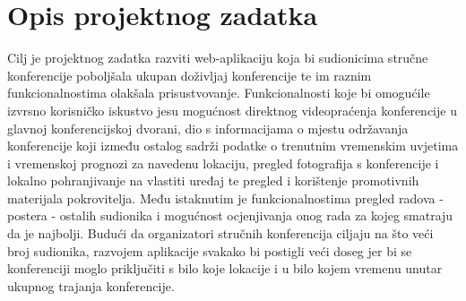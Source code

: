 \chapter{Opis projektnog zadatka}
		
		
		

		Cilj je projektnog zadatka razviti web-aplikaciju koja bi sudionicima stručne konferencije poboljšala ukupan doživljaj konferencije te im raznim funkcionalnostima olakšala prisustvovanje. Funkcionalnosti koje bi omogućile izvrsno korisničko iskustvo jesu mogućnost direktnog videopraćenja konferencije u glavnoj konferencijskoj dvorani, dio s informacijama o mjestu održavanja konferencije koji između ostalog sadrži podatke o trenutnim vremenskim uvjetima i vremenskoj prognozi za navedenu lokaciju, pregled fotografija s konferencije i lokalno pohranjivanje na vlastiti uređaj te pregled i korištenje promotivnih materijala pokrovitelja. Među istaknutim je funkcionalnostima pregled radova - postera - ostalih sudionika i mogućnost ocjenjivanja onog rada za kojeg smatraju da je najbolji. Budući da organizatori stručnih konferencija ciljaju na što veći broj sudionika, razvojem aplikacije svakako bi postigli veći doseg jer bi se konferenciji moglo priključiti s bilo koje lokacije i u bilo kojem vremenu unutar ukupnog trajanja konferencije.\\
		
